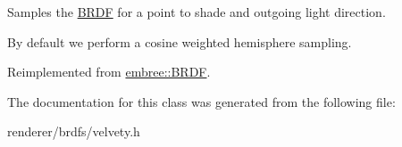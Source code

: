 Samples the \hyperlink{classembree_1_1_b_r_d_f}{BRDF} for a point to shade and outgoing light direction. 

By default we perform a cosine weighted hemisphere sampling. 

Reimplemented from \hyperlink{classembree_1_1_b_r_d_f_a6eb1a114a4f36dc2c1ad65bcbce5f809}{embree::BRDF}.



The documentation for this class was generated from the following file:\begin{DoxyCompactItemize}
\item 
renderer/brdfs/velvety.h\end{DoxyCompactItemize}
